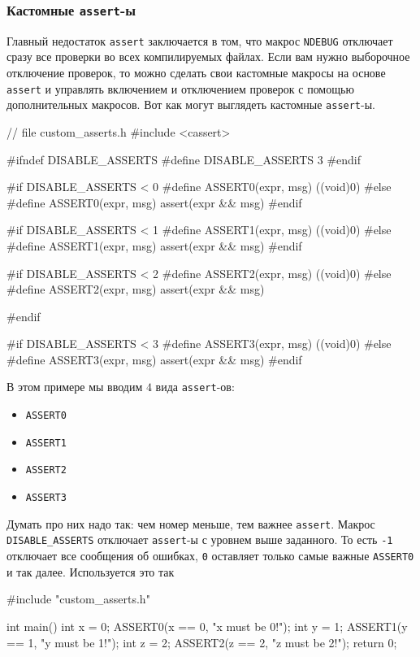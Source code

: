 \subsubsection{Кастомные \texttt{assert}-ы}

Главный недостаток \verb"assert" заключается в том, что макрос \verb"NDEBUG" отключает сразу все проверки во всех компилируемых файлах.
Если вам нужно выборочное отключение проверок, то можно сделать свои кастомные макросы на основе \verb"assert" и управлять включением и отключением проверок с помощью дополнительных макросов.
Вот как могут выглядеть кастомные \verb"assert"-ы.
\begin{cppcode}
// file custom_asserts.h
#include <cassert>

#ifndef DISABLE_ASSERTS
#define DISABLE_ASSERTS 3
#endif

#if DISABLE_ASSERTS < 0
#define ASSERT0(expr, msg) ((void)0)
#else
#define ASSERT0(expr, msg) assert(expr && msg)
#endif

#if DISABLE_ASSERTS < 1
#define ASSERT1(expr, msg) ((void)0)
#else
#define ASSERT1(expr, msg) assert(expr && msg)
#endif

#if DISABLE_ASSERTS < 2
#define ASSERT2(expr, msg) ((void)0)
#else
#define ASSERT2(expr, msg) assert(expr && msg)

#endif

#if DISABLE_ASSERTS < 3
#define ASSERT3(expr, msg) ((void)0)
#else
#define ASSERT3(expr, msg) assert(expr && msg)
#endif
\end{cppcode}
В этом примере мы вводим $4$ вида \verb"assert"-ов:
\begin{multicols}{4}
\begin{itemize}
\item \verb"ASSERT0"

\item \verb"ASSERT1"

\item \verb"ASSERT2"

\item \verb"ASSERT3"
\end{itemize}
\end{multicols}
Думать про них надо так: чем номер меньше, тем важнее \verb"assert".
Макрос \verb"DISABLE_ASSERTS" отключает \verb"assert"-ы с уровнем выше заданного.
То есть \verb"-1" отключает все сообщения об ошибках, \verb"0" оставляет только самые важные \verb"ASSERT0" и так далее.
Используется это так
\begin{cppcode}
#include "custom_asserts.h"

int main() {
  int x = 0;
  ASSERT0(x == 0, "x must be 0!");
  int y = 1;
  ASSERT1(y == 1, "y must be 1!");
  int z = 2;
  ASSERT2(z == 2, "z must be 2!");
  return 0;
}
\end{cppcode}
